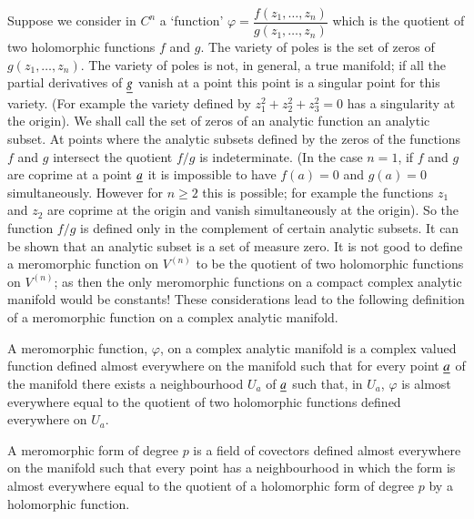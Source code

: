 Suppose we consider in $C^{n}$ a `function'
$\varphi=\dfrac{f(z_{1},\ldots,z_{n})}{g(z_{1},\ldots,z_{n})}$ which
is the quotient of two holomorphic functions $f$ and $g$. The variety
of poles is the set of zeros of $g(z_{1},\ldots,z_{n})$. The variety
of poles is not, in general, a true manifold; if all the partial
derivatives of $\underline{g}$ vanish at a point this point is a singular
point for this variety. (For example the variety defined by
$z^{2}_{1}+z^{2}_{2}+z^{2}_{3}=0$ has a singularity at the origin). We
shall call the set of zeros of an analytic function an analytic
subset. At points where the analytic subsets defined by the zeros of
the functions $f$ and $g$ intersect the quotient $f/g$ is
indeterminate. (In the case $n=1$, if $f$ and $g$ are coprime at a
point $\underline{a}$ it is impossible to have $f(a)=0$ and $g(a)=0$
simultaneously. However for $n\geq 2$ this is possible; for example
the functions $z_{1}$ and $z_{2}$ are coprime at the origin and vanish
simultaneously at the origin). So the function $f/g$ is\pageoriginale
defined only in the complement of certain analytic subsets. It can be
shown that an analytic subset is a set of measure zero. It is not good
to define a meromorphic function on $V^{(n)}$ to be the quotient of
two holomorphic functions on $V^{(n)}$; as then the only meromorphic
functions on a compact complex analytic manifold would be constants!
These considerations lead to the following definition of a meromorphic
function on a complex analytic manifold.

A meromorphic function, $\varphi$, on a complex analytic manifold is a
complex valued function defined almost everywhere on the manifold such
that for every point $\underline{a}$ of the manifold there exists a
neighbourhood $U_{a}$ of $\underline{a}$ such that, in $U_{a}$, $\varphi$ is
almost everywhere equal to the quotient of two holomorphic functions
defined everywhere on $U_{a}$.

A meromorphic form of degree $p$ is a field of covectors defined
almost everywhere on the manifold such that every point has a
neighbourhood in which the form is almost everywhere equal to the
quotient of a holomorphic form of degree $p$ by a holomorphic
function.

